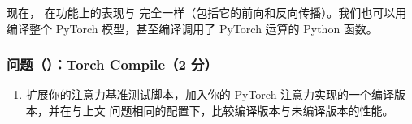 现在， 在功能上的表现与  完全一样（包括它的前向和反向传播）。我们也可以用  编译整个 PyTorch 模型，甚至编译调用了 PyTorch 运算的 Python 函数。

\subsubsection*{问题（）：Torch Compile（2 分）}

\begin{enumerate}[label=(\alph*)]
  \item 扩展你的注意力基准测试脚本，加入你的 PyTorch 注意力实现的一个编译版本，并在与上文  问题相同的配置下，比较编译版本与未编译版本的性能。
\end{enumerate}
